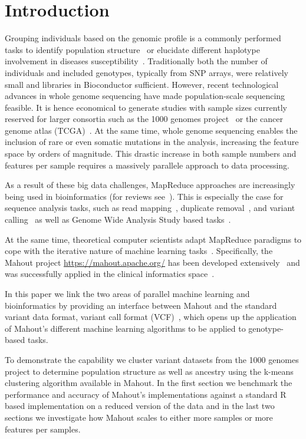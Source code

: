 \documentclass{bioinfo}
\begin{document}
\section{Introduction}

Grouping individuals based on the genomic profile is a commonly performed tasks to identify population structure~\cite{Gao2007} or elucidate different haplotype involvement in diseases susceptibility~\cite{Laitman2013}.  Traditionally both the number of individuals and included genotypes, typically from SNP arrays, were relatively small and libraries in Bioconductor sufficient. However, recent technological advances in whole genome sequencing have made population-scale sequencing feasible. It is hence economical to generate studies with sample sizes currently reserved for larger consortia such as the 1000 genomes project~\cite{1KG2012} or the cancer genome atlas (TCGA)~\cite{TCGA2013}. At the same time, whole genome sequencing enables the inclusion of rare or even somatic mutations in the analysis, increasing the feature space by orders of magnitude. This drastic increase in both sample numbers and features per sample requires a massively parallele approach to data processing. 

As a result of these big data challenges, MapReduce approaches are increasingly being used in bioinformatics (for reviews see~\cite{Zou2013, Qiu2010,Taylor2010}). This is especially the case for sequence analysis tasks, such as read mapping~\cite{Schatz2009}, duplicate removal~\cite{Jourdren2012}, and variant calling~\cite{Langmead2009, McKenna2010} as well as Genome Wide Analysis Study based tasks~\cite{Huang2013, Guo2014}.


At the same time, theoretical computer scientists adapt MapReduce paradigms to cope with the iterative nature of machine learning tasks~\cite{Chu2009}. Specifically, the Mahout project \url{https://mahout.apache.org/} has been developed extensively~\cite{Ranger2007, Owen2011} and was successfully applied in the clinical informatics space~\cite{Dong2013}.

In this paper we link the two areas of parallel machine learning and bioinformatics by providing an interface between Mahout and the standard variant data format, variant call format (VCF)~\cite{1KG2012}, which opens up the application of Mahout's different machine learning algorithms to be applied to genotype-based tasks. 

To demonstrate the capability we cluster variant datasets from the 1000 genomes project to determine population structure as well as ancestry using the k-means clustering algorithm available in Mahout. In the first section we benchmark the performance and accuracy of Mahout's implementations against a standard R based implementation on a reduced version of the data and in the last two sections we investigate how Mahout scales to either more samples or more features per samples.   
\end{document}
